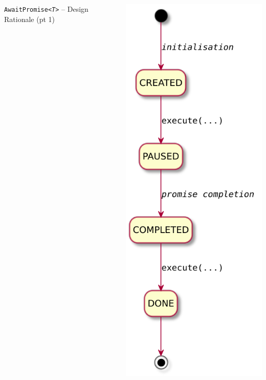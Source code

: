 \documentclass[presentation]{beamer}\mode<presentation>{\usetheme{AMSCesenaPurpleAndGold}}
\begin{document}
\begin{frame}[allowframebreaks]
\begin{columns}
\begin{column}{.8\linewidth}
\begin{exampleblock}{\texttt{AwaitPromise\textit{<T>}} -- Design Rationale (pt 1)}
\begin{itemize}
				\end{itemize}
			\end{exampleblock}
		\end{column}
		\begin{column}{.18\linewidth}
			\includegraphics[width=\linewidth]{img/AwaitFSA.pdf}
		\end{column}
	\end{columns}


\end{frame}
\end{document}
